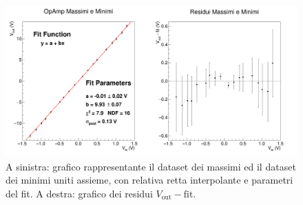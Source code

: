 \documentclass[a4paper,11pt]{article} %
\begin{document}
\begin{figure}[H]
	\centering
	\includegraphics[width=\linewidth]{../Plots/Report_Plots/opamp_plot_all_projected.png}
	\caption{\small A sinistra: grafico rappresentante il dataset dei massimi ed il dataset dei minimi uniti assieme, 
	con relativa retta interpolante e parametri del fit. A destra: grafico dei residui $V_{\text{out}}-\text{fit}$.}
	\label{i:opamp_all_proj}
\end{figure}
\end{document}
